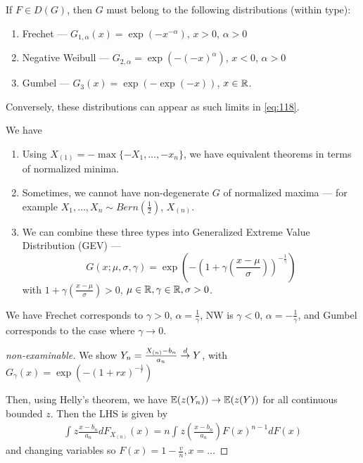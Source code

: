 \begin{thm}
  \label{defn:extreme_value_theory:3}
  If $F \in D(G)$, then $G$ must belong to the following distributions
  (within type):

  \begin{enumerate}
  \item Frechet --- $G_{1, \alpha}(x) = \exp(-x^{-\alpha})$, $x > 0$,
    $\alpha > 0$
  \item Negative Weibull --- $G_{2, \alpha} = \exp(- (-x)^{\alpha})$, $x
    < 0$, $\alpha > 0$
  \item Gumbel --- $G_{3}(x) = \exp(-\exp(-x))$, $x \in \mathbb{R}$.
  \end{enumerate}

  Conversely, these distributions can appear as such limits in \eqref{eq:118}.
\end{thm}

\begin{remark}
  We have
  \begin{enumerate}
  \item Using $X_{(1)} = -\max \{ -X_{1}, \dots, -x_{n} \} $, we have
    equivalent theorems in terms of normalized minima.
  \item Sometimes, we cannot have non-degenerate $G$ of normalized
    maxima --- for example $X_{1}, \dots, X_{n} \sim
    Bern(\frac{1}{2})$, $X_{(n)}$.
  \item We can combine these three types into Generalized Extreme
    Value Distribution (GEV) ---
    \begin{equation}
      \label{eq:122}
      G(x; \mu, \sigma, \gamma) = \exp(- (1 + \gamma(\frac{x-\mu}{\sigma}))^{-\frac{1}{\gamma}})
    \end{equation} with $1 + \gamma(\frac{x - \mu}{\sigma}) > 0$, $\mu
    \in \mathbb{R}, \gamma \in \mathbb{R}, \sigma > 0$.
  \end{enumerate}

  We have Frechet corresponds to $\gamma > 0$, $\alpha =
  \frac{1}{\gamma} $, NW is $\gamma < 0$, $\alpha =
  -\frac{1}{\gamma}$, and Gumbel corresponds to the case where $\gamma
  \rightarrow 0$.
\end{remark}

\begin{proof}[non-examinable]
  We show $Y_{n} = \frac{X_{(n)} - b_{n}}{a_{n}} \overset{d}{\rightarrow} Y$, with
  $G_{\gamma}(x) = \exp(- (1 + rx)^{-\frac{1}{r}})$

  Then, using Helly's theorem, we have $\E{z(Y_{n})} \rightarrow
  \E{z(Y)}$ for all continuous bounded $z$.  Then the LHS is given by
  \begin{align}
    \label{eq:123}
    \int_{}^{} z \frac{x - b_{n}}{a_{n}} d F_{X_{(n)}}(x) = n
    \int_{}^{} z(\frac{x - b_{n}}{a_{n}}) F(x)^{n-1} dF(x)
  \end{align} and changing variables so $F(x) = 1 - \frac{v}{n}, x = \dots$
\end{proof}

